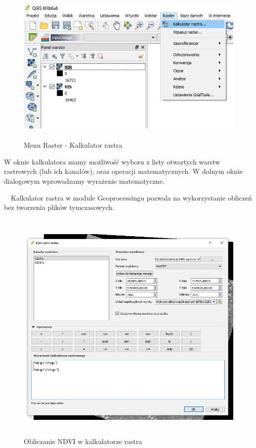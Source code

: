 \documentclass[12pt,a4paper]{book}
\begin{document}
\begin{center}
\begin{figure}
\includegraphics[width=13cm,height=7.691cm]{004-kalkulator.jpg}
\caption{Menu Raster - Kalkulator rastra}
\end{figure}
\end{center}
W oknie kalkulatora mamy możliwość wyboru z listy otwartych warstw rastrowych (lub ich kanałów), oraz operacji matematycznych. W dolnym oknie dialogowym wprowadzamy wyrażenie matematyczne.

\ \ Kalkulator rastra w module Geoprocessingu pozwala na wykorzystanie obliczeń bez tworzenia plików tymczasowych.

\begin{center}
\begin{figure}
\includegraphics[width=13cm,height=11.532cm]{004-kalkulator-ndvi.png}
\caption{Obliczanie NDVI w kalkulatorze rastra}
\end{figure}
\end{center}
\end{document}
